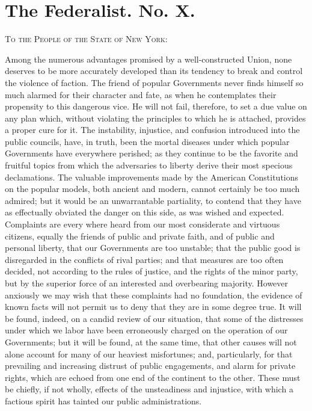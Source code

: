 
\author{James Madison}
\chapter{The Federalist. No. X.}


\begin{abstract}{c}{[From the New York Packet, Friday,
November 23, 1787.]}\end{abstract}

\noindent\textsc{To the People of the State of New York}:

Among the numerous advantages promised by a well-constructed Union,
none deserves to be more accurately developed than its tendency to
break and control the violence of faction. The friend of popular
Governments never finds himself so much alarmed for their character
and fate, as when he contemplates their propensity to this dangerous
vice. He will not fail, therefore, to set a due value on any plan
which, without violating the principles to which he is attached,
provides a proper cure for it. The instability, injustice, and
confusion introduced into the public councils, have, in truth, been
the mortal diseases under which popular Governments have everywhere
perished; as they continue to be the favorite and fruitful topics from
which the adversaries to liberty derive their most specious
declamations. The valuable improvements made by the American
Constitutions on the popular models, both ancient and modern, cannot
certainly be too much admired; but it would be an unwarrantable
partiality, to contend that they have as effectually obviated the
danger on this side, as was wished and expected. Complaints are every
where heard from our most considerate and virtuous citizens, equally
the friends of public and private faith, and of public and personal
liberty, that our Governments are too unstable; that the public good
is disregarded in the conflicts of rival parties; and that measures
are too often decided, not according to the rules of justice, and the
rights of the minor party, but by the superior force  of an
interested and overbearing majority. However anxiously we may wish
that these complaints had no foundation, the evidence of known facts
will not permit us to deny that they are in some degree true. It will
be found, indeed, on a candid review of our situation, that some of
the distresses under which we labor have been erroneously charged on
the operation of our Governments; but it will be found, at the same
time, that other causes will not alone account for many of our
heaviest misfortunes; and, particularly, for that prevailing and
increasing distrust of public engagements, and alarm for private
rights, which are echoed from one end of the continent to the other.
These must be chiefly, if not wholly, effects of the unsteadiness and
injustice, with which a factious spirit has tainted our public
administrations.

